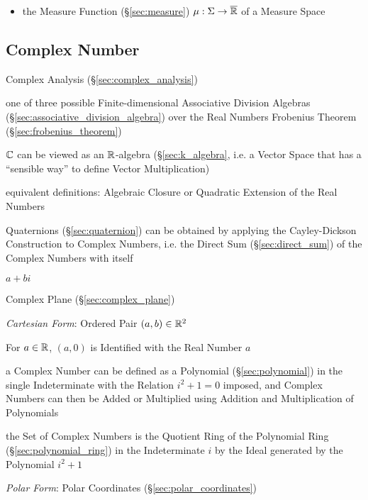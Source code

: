\begin{itemize}
  \item the Measure Function (\S\ref{sec:measure}) $\mu : \Sigma \rightarrow
    \overline{\mathbb{R}}$ of a Measure Space
\end{itemize}



\subsection{Complex Number}\label{sec:complex_number}

\fist Complex Analysis (\S\ref{sec:complex_analysis})

one of three possible Finite-dimensional Associative Division Algebras
(\S\ref{sec:associative_division_algebra}) over the Real Numbers \fist
Frobenius Theorem (\S\ref{sec:frobenius_theorem})

$\mathbb{C}$ can be viewed as an $\mathbb{R}$-algebra (\S\ref{sec:k_algebra}, i.e. a
Vector Space that has a ``sensible way'' to define Vector Multiplication)

equivalent definitions: Algebraic Closure or Quadratic Extension of
the Real Numbers

Quaternions (\S\ref{sec:quaternion}) can be obtained by applying the
Cayley-Dickson Construction to Complex Numbers, i.e. the Direct Sum
(\S\ref{sec:direct_sum}) of the Complex Numbers with itself

$a + bi$

Complex Plane (\S\ref{sec:complex_plane})

\emph{Cartesian Form}: Ordered Pair $(a,b) \in \mathbb{R}^2$

For $a \in \mathbb{R}$, $(a,0)$ is Identified with the Real Number $a$

a Complex Number can be defined as a Polynomial (\S\ref{sec:polynomial}) in the
single Indeterminate with the Relation $i^2 + 1 = 0$ imposed, and Complex
Numbers can then be Added or Multiplied using Addition and Multiplication of
Polynomials

the Set of Complex Numbers is the Quotient Ring of the Polynomial Ring
(\S\ref{sec:polynomial_ring}) in the Indeterminate $i$ by the Ideal generated by
the Polynomial $i^2 + 1$

\emph{Polar Form}: Polar Coordinates (\S\ref{sec:polar_coordinates})

